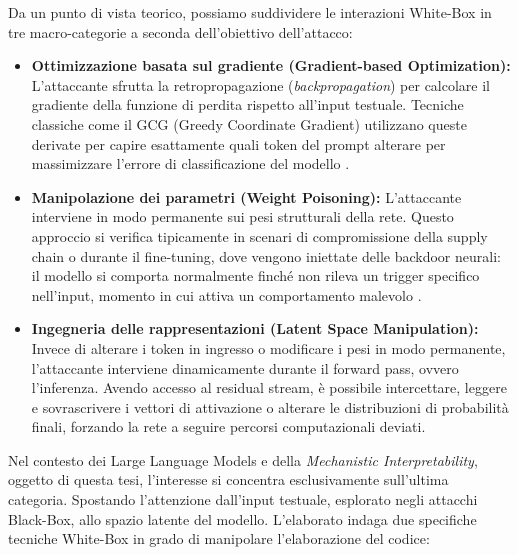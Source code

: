 Da un punto di vista teorico, possiamo suddividere le interazioni White-Box in tre macro-categorie a seconda dell'obiettivo dell'attacco:
\begin{itemize}
    \item \textbf{Ottimizzazione basata sul gradiente (Gradient-based Optimization):} L'attaccante sfrutta la retropropagazione (\textit{backpropagation}) per calcolare il gradiente della funzione di perdita rispetto all'input testuale. Tecniche classiche come il GCG (Greedy Coordinate Gradient) utilizzano queste derivate per capire esattamente quali token del prompt alterare per massimizzare l'errore di classificazione del modello \cite{zou2023universaltransferableadversarialattacks}.
    
    \item \textbf{Manipolazione dei parametri (Weight Poisoning):} L'attaccante interviene in modo permanente sui pesi strutturali della rete. Questo approccio si verifica tipicamente in scenari di compromissione della supply chain o durante il fine-tuning, dove vengono iniettate delle backdoor neurali: il modello si comporta normalmente finché non rileva un trigger specifico nell'input, momento in cui attiva un comportamento malevolo \cite{kurita2020weightpoisoningattackspretrained}.
    
    \item \textbf{Ingegneria delle rappresentazioni (Latent Space Manipulation):} Invece di alterare i token in ingresso o modificare i pesi in modo permanente, l'attaccante interviene dinamicamente durante il forward pass, ovvero l'inferenza. Avendo accesso al residual stream, è possibile intercettare, leggere e sovrascrivere i vettori di attivazione o alterare le distribuzioni di probabilità finali, forzando la rete a seguire percorsi computazionali deviati.
\end{itemize}

Nel contesto dei Large Language Models e della \textit{Mechanistic Interpretability}, oggetto di questa tesi, l'interesse si concentra esclusivamente sull'ultima categoria. Spostando l'attenzione dall'input testuale, esplorato negli attacchi Black-Box, allo spazio latente del modello. L'elaborato indaga due specifiche tecniche White-Box in grado di manipolare l'elaborazione del codice:

